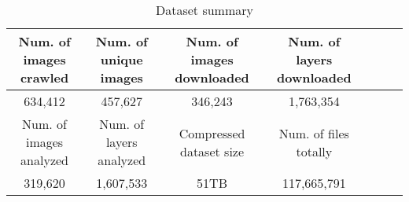 
\begin{table*}
	\centering
	\caption{Dataset summary} \label{tab-dataset-summary}
	\begin{tabular}{c|c|c|c|c|c|c}%
		\hline
		Num. of images crawled & Num. of unique images    & Num. of images downloaded  & Num. of layers downloaded \\
		\hline
		634,412                 & 457,627                 & 346,243                    & 1,763,354  \\
		\hline
		Num. of images analyzed & Num. of layers analyzed & Compressed dataset size              &  Num. of files totally \\
		\hline
		319,620                     & 1,607,533                     & 51TB                        & 117,665,791  \\
		\hline
	\end{tabular}
\end{table*}

